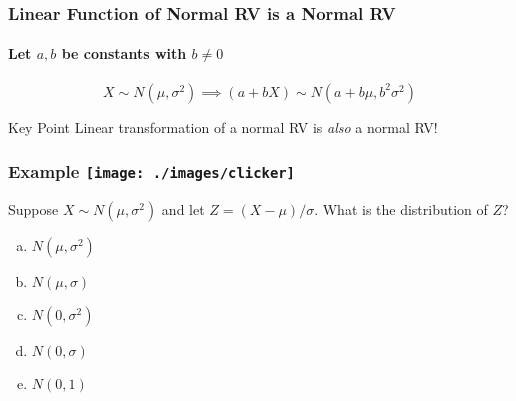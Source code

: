 

\begin{frame}
\frametitle{Linear Function of Normal RV is a Normal RV}
\framesubtitle{Let $a,b$ be constants with $b \neq 0$}

\[
  \boxed{X \sim N(\mu, \sigma^2) \implies (a + bX) \sim N(a + b\mu, b^2 \sigma^2)}
\]

\begin{alertblock}{Key Point}
  Linear transformation of a normal RV is \emph{also} a normal RV!
\end{alertblock}

\end{frame}

\begin{frame}
\frametitle{Example \hfill \texttt{[image: ./images/clicker]}}
Suppose $X \sim N(\mu, \sigma^2)$ and let $Z = (X -\mu)/\sigma$. What is the distribution of $Z$?

\begin{enumerate}[(a)]
	\item $N(\mu, \sigma^2)$
	\item $N(\mu, \sigma)$
	\item $N(0, \sigma^2)$
	\item  $N(0, \sigma)$
	\item $N(0,1)$
\end{enumerate}
\end{frame}

